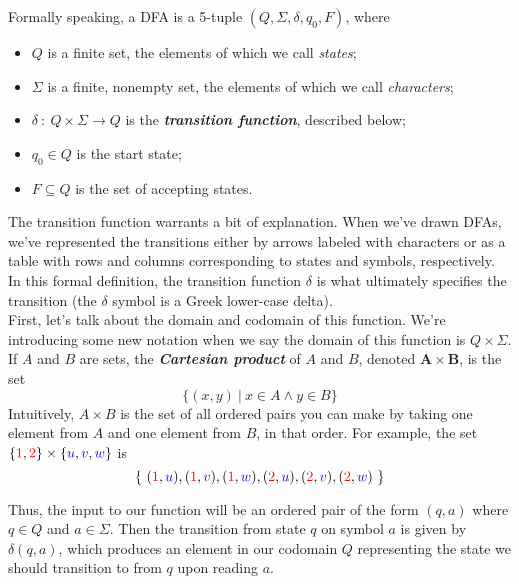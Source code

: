 \documentclass{article}
\renewcommand{\(}{\left(}
\renewcommand{\)}{\right)}
\theoremstyle{plain}
\theoremstyle{plain}
\theoremstyle{definition}
\renewcommand{\emph}[1]{\textit{\textbf{#1}}}
\begin{document}
Formally speaking, a DFA is a 5-tuple $(Q, \Sigma, \delta, q_0, F)$, where
\begin{itemize}
    \item $Q$ is a finite set, the elements of which we call \textit{states};
    \item $\Sigma$ is a finite, nonempty set, the elements of which we call \textit{characters};
    \item $\delta\ :\ Q \times \Sigma \rightarrow Q$ is the \emph{transition function}, described below;
    \item $q_0 \in Q$ is the start state;
    \item $F \subseteq Q$ is the set of accepting states.
\end{itemize}
The transition function warrants a bit of explanation. When we've drawn DFAs, we've represented the transitions either by arrows labeled with characters or as a table with rows and columns corresponding to states and symbols, respectively. In this formal definition, the transition function $\delta$ is what ultimately specifies the transition (the $\delta$ symbol is a Greek lower-case delta). \\

First, let's talk about the domain and codomain of this function. We're introducing some new notation when we say the domain of this function is $Q \times \Sigma$. If $A$ and $B$ are sets, the \textbf{\textit{Cartesian product}} of $A$ and $B$, denoted $\mathbf{A \times B}$,
is the set
\begin{equation*}
\{ (x, y)\ |\ x \in A \land y \in B \}
\end{equation*}
Intuitively, $A \times B$ is the set of all ordered pairs you can make by taking one element from $A$ and one element
from $B$, in that order. For example, the set $\{\textcolor{red}{1}, \textcolor{red}{2}\} \times \{\textcolor{blue}{u}, \textcolor{blue}{v}, \textcolor{blue}{w}\}$ is
\begin{equation*}
\{\ (\textcolor{red}{1}, \textcolor{blue}{u}), (\textcolor{red}{1}, \textcolor{blue}{v}), (\textcolor{red}{1}, \textcolor{blue}{w}), (\textcolor{red}{2}, \textcolor{blue}{u}), (\textcolor{red}{2}, \textcolor{blue}{v}), (\textcolor{red}{2}, \textcolor{blue}{w})\ \}
\end{equation*}

Thus, the input to our function will be an ordered pair of the form $(q, a)$ where $q \in Q$ and $a \in \Sigma$. Then the transition from state $q$ on symbol $a$ is given by $\delta(q, a)$, which produces an element in our codomain $Q$ representing the state we should transition to from $q$ upon reading $a$. \\
\end{document}
